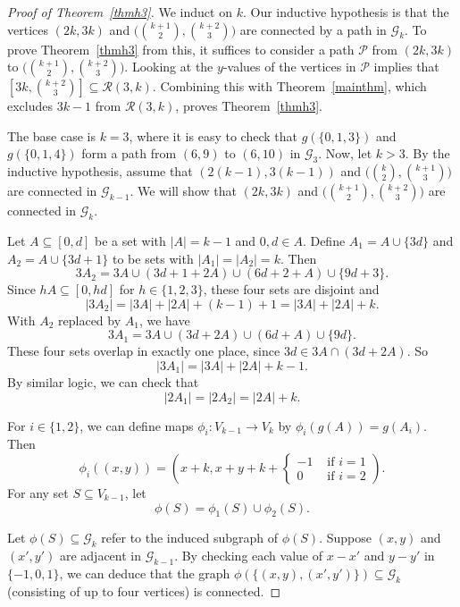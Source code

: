 \documentclass[10pt,a4paper]{article}
\theoremstyle{definition}
\theoremstyle{remark}
\numberwithin{equation}{section}
\numberwithin{theorem}{section}
\newcommand{\calg}{\mathcal{G}}
\newcommand{\calr}{\mathcal{R}}
\begin{document}
\begin{proof}[Proof of Theorem~\ref{thmh3}]
    We induct on $k$. Our inductive hypothesis is that the vertices $(2k,3k)$ and $\big(\binom{k+1}{2},\binom{k+2}{3}\big)$ are connected by a path in $\calg_k$. To prove Theorem~\ref{thmh3} from this, it suffices to consider a path $\mathcal{P}$ from $(2k,3k)$ to $\big(\binom{k+1}{2},\binom{k+2}{3}\big)$. Looking at the $y$-values of the vertices in $\mathcal{P}$ implies that $\left[3k,\binom{k+2}{3}\right] \subseteq \mathcal{R}(3,k)$. Combining this with Theorem~\ref{mainthm}, which excludes $3k-1$ from $\calr(3,k)$, proves Theorem~\ref{thmh3}.

    The base case is $k=3$, where it is easy to check that $g(\{0,1,3\})$ and $g(\{0,1,4\})$ form a path from $(6,9)$ to $(6,10)$ in $\calg_3$. Now, let $k > 3$. By the inductive hypothesis, assume that $(2(k-1),3(k-1))$ and $\big(\binom{k}{2},\binom{k+1}{3}\big)$ are connected in $\calg_{k-1}$. We will show that $(2k,3k)$ and $\big(\binom{k+1}{2},\binom{k+2}{3}\big)$ are connected in $\calg_k$.

    Let $A \subseteq [0,d]$ be a set with $|A| = k-1$ and $0,d \in A$. Define $A_1 = A \cup \{3d\}$ and $A_2 = A \cup \{3d+1\}$ to be sets with $|A_1| = |A_2| = k$. Then \begin{equation}\label{eqanalogy}3A_2 = 3A\cup (3d+1+2A) \cup (6d+2+A) \cup \{9d+3\}.\end{equation} Since $hA \subseteq [0,hd]$ for $h \in \{1,2,3\}$, these four sets are disjoint and \[|3A_2| = |3A|+|2A|+(k-1)+1 = |3A|+|2A|+k.\] With $A_2$ replaced by $A_1$, we have \[3A_1 = 3A\cup (3d+2A) \cup (6d+A) \cup \{9d\}.\] These four sets overlap in exactly one place, since $3d \in 3A\cap (3d+2A)$. So \[|3A_1| = |3A|+|2A|+k-1.\] By similar logic, we can check that \[|2A_1|=|2A_2| = |2A|+k.\] 
    
    For $i \in \{1,2\}$, we can define maps $\phi_i:V_{k-1} \to V_k$ by $\phi_i(g(A)) = g(A_i)$. Then \[\phi_i((x,y)) = \left(x+k,x+y+k+\begin{cases}
        -1 & \text{ if } i = 1 \\
        0 &\text{ if } i = 2 
    \end{cases}\right).\]
    For any set $S \subseteq V_{k-1}$, let \[\phi(S) = \phi_1(S) \cup \phi_2(S).\] 
    
    Let $\phi(S) \subseteq \calg_k$ refer to the induced subgraph of $\phi(S)$. Suppose $(x,y)$ and $(x',y')$ are adjacent in $\calg_{k-1}$. By checking each value of $x-x'$ and $y-y'$ in $\{-1,0,1\}$, we can deduce that the graph $\phi(\{(x,y),(x',y')\}) \subseteq \calg_k$ (consisting of up to four vertices) is connected. 
    

\end{proof}
\end{document}
